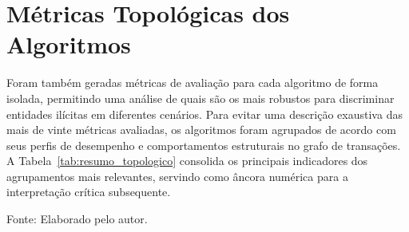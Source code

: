 \documentclass[titlepage,a4paper,oneside,onecolumn,12pt]{report}
\newcommand{\source}[1]{\par\noindent\footnotesize Fonte: #1\par}
\begin{document}
\section{Métricas Topológicas dos Algoritmos}
\label{sec:analise_critica_topologia}

Foram também geradas métricas de avaliação para cada algoritmo de forma isolada, permitindo uma análise de quais são os mais robustos para discriminar entidades ilícitas em diferentes cenários.
Para evitar uma descrição exaustiva das mais de vinte métricas avaliadas, os algoritmos foram agrupados de acordo com seus perfis de desempenho e comportamentos estruturais no grafo de transações. A Tabela~\ref{tab:resumo_topologico} consolida os principais indicadores dos agrupamentos mais relevantes, servindo como âncora numérica para a interpretação crítica subsequente.

\begin{table}
    \centering
    \caption{Resumo comparativo dos agrupamentos métricos estruturais}
    \label{tab:resumo_topologico}
    \source{Elaborado pelo autor.}
\end{table}
\end{document}
